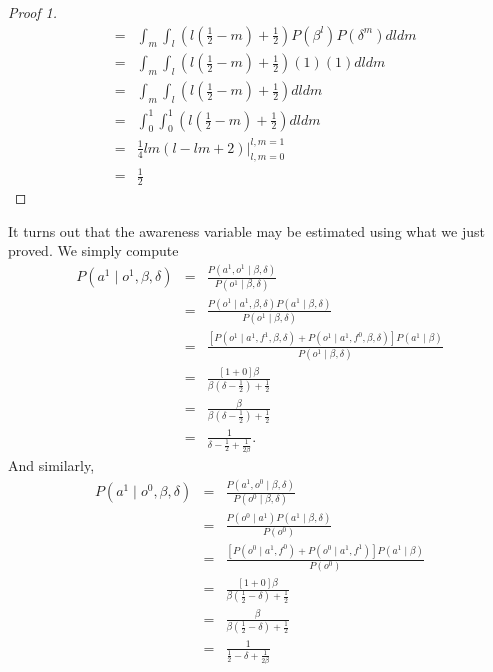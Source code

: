 \documentclass{amsart}
\theoremstyle{plain}
\numberwithin{equation}{section}
\begin{document}
\begin{proof}[Proof 1]
\begin{eqnarray*}
&=&\int_{m}\int_{l}\left( l\left( \frac{1}{2}-m\right) +\frac{1}{2}\right)
P\left( \beta ^{l}\right) P\left( \delta ^{m}\right) dldm \\
&=&\int_{m}\int_{l}\left( l\left( \frac{1}{2}-m\right) +\frac{1}{2}\right)
\left( 1\right) \left( 1\right) dldm \\
&=&\int_{m}\int_{l}\left( l\left( \frac{1}{2}-m\right) +\frac{1}{2}\right)
dldm \\
&=&\int_{0}^{1}\int_{0}^{1}\left( l\left( \frac{1}{2}-m\right) +\frac{1}{2}%
\right) dldm \\
&=&\frac{1}{4}lm\left( l-lm+2\right) |_{l,m=0}^{l,m=1} \\
&=&\frac{1}{2}
\end{eqnarray*}
\end{proof}

It turns out that the awareness variable may be estimated using what we just
proved. We simply compute%
\begin{eqnarray*}
P\left( a^{1}\mid o^{1},\beta ,\delta \right)  &=&\frac{P\left(
a^{1},o^{1}\mid \beta ,\delta \right) }{P\left( o^{1}\mid \beta ,\delta
\right) } \\
&=&\frac{P\left( o^{1}\mid a^{1},\beta ,\delta \right) P\left( a^{1}\mid
\beta ,\delta \right) }{P\left( o^{1}\mid \beta ,\delta \right) } \\
&=&\frac{\left[ P\left( o^{1}\mid a^{1},f^{1},\beta ,\delta \right) +P\left(
o^{1}\mid a^{1},f^{0},\beta ,\delta \right) \right] P\left( a^{1}\mid \beta
\right) }{P\left( o^{1}\mid \beta ,\delta \right) } \\
&=&\frac{\left[ 1+0\right] \beta }{\beta \left( \delta -\frac{1}{2}\right) +%
\frac{1}{2}} \\
&=&\frac{\beta }{\beta \left( \delta -\frac{1}{2}\right) +\frac{1}{2}} \\
&=&\frac{1}{\delta -\frac{1}{2}+\frac{1}{2\beta }}.
\end{eqnarray*}%
And similarly,%
\begin{eqnarray*}
P\left( a^{1}\mid o^{0},\beta ,\delta \right)  &=&\frac{P\left(
a^{1},o^{0}\mid \beta ,\delta \right) }{P\left( o^{0}\mid \beta ,\delta
\right) } \\
&=&\frac{P\left( o^{0}\mid a^{1}\right) P\left( a^{1}\mid \beta ,\delta
\right) }{P\left( o^{0}\right) } \\
&=&\frac{\left[ P\left( o^{0}\mid a^{1},f^{0}\right) +P\left( o^{0}\mid
a^{1},f^{1}\right) \right] P\left( a^{1}\mid \beta \right) }{P\left(
o^{0}\right) } \\
&=&\frac{\left[ 1+0\right] \beta }{\beta \left( \frac{1}{2}-\delta \right) +%
\frac{1}{2}} \\
&=&\frac{\beta }{\beta \left( \frac{1}{2}-\delta \right) +\frac{1}{2}} \\
&=&\frac{1}{\frac{1}{2}-\delta +\frac{1}{2\beta }}
\end{eqnarray*}
\end{document}

